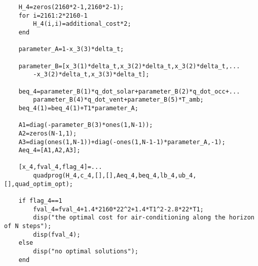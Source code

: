 \documentclass[titlepage,a4paper]{article}
\begin{document}
\begin{lstlisting}
    H_4=zeros(2160*2-1,2160*2-1);
    for i=2161:2*2160-1
        H_4(i,i)=additional_cost*2;
    end
    
    parameter_A=1-x_3(3)*delta_t;
    
    parameter_B=[x_3(1)*delta_t,x_3(2)*delta_t,x_3(2)*delta_t,...
        -x_3(2)*delta_t,x_3(3)*delta_t];
    
    beq_4=parameter_B(1)*q_dot_solar+parameter_B(2)*q_dot_occ+...
        parameter_B(4)*q_dot_vent+parameter_B(5)*T_amb;
    beq_4(1)=beq_4(1)+T1*parameter_A;
    
    A1=diag(-parameter_B(3)*ones(1,N-1));
    A2=zeros(N-1,1);
    A3=diag(ones(1,N-1))+diag(-ones(1,N-1-1)*parameter_A,-1);
    Aeq_4=[A1,A2,A3];
    
    [x_4,fval_4,flag_4]=...
        quadprog(H_4,c_4,[],[],Aeq_4,beq_4,lb_4,ub_4,[],quad_optim_opt);
    
    if flag_4==1
        fval_4=fval_4+1.4*2160*22^2+1.4*T1^2-2.8*22*T1;
        disp("the optimal cost for air-conditioning along the horizon of N steps");
        disp(fval_4);
    else
        disp("no optimal solutions");
    end

        
\end{lstlisting}



\ifx \allfiles \undefined    
\end{document}

